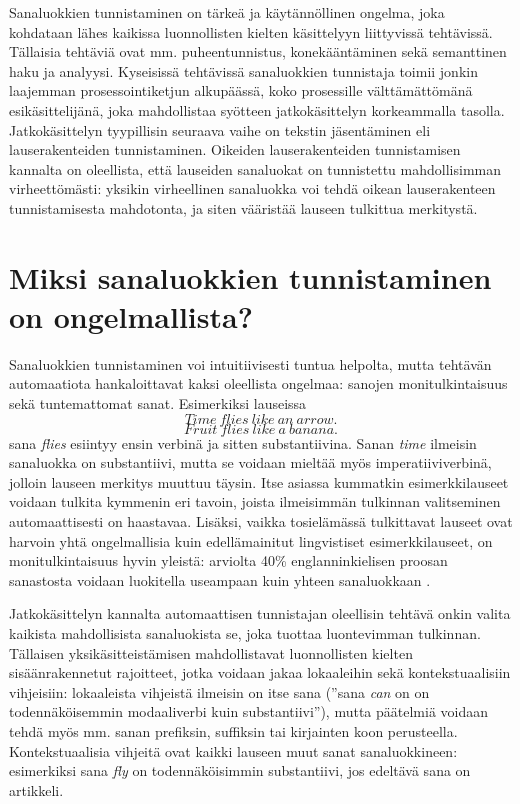 \documentclass[utf8,bachelor,manualbib]{gradu3}
\begin{document}
Sanaluokkien tunnistaminen on tärkeä ja käytännöllinen ongelma, joka kohdataan lähes kaikissa luonnollisten kielten käsittelyyn liittyvissä tehtävissä. Tällaisia tehtäviä ovat mm. puheentunnistus, konekääntäminen sekä semanttinen haku ja analyysi. Kyseisissä tehtävissä sanaluokkien tunnistaja toimii jonkin laajemman prosessointiketjun alkupäässä, koko prosessille välttämättömänä esikäsittelijänä, joka mahdollistaa syötteen jatkokäsittelyn korkeammalla tasolla. Jatkokäsittelyn tyypillisin seuraava vaihe on tekstin jäsentäminen eli lauserakenteiden tunnistaminen. Oikeiden lauserakenteiden tunnistamisen kannalta on oleellista, että lauseiden sanaluokat on tunnistettu mahdollisimman virheettömästi: yksikin virheellinen sanaluokka voi tehdä oikean lauserakenteen tunnistamisesta mahdotonta, ja siten vääristää lauseen tulkittua merkitystä.


\section{Miksi sanaluokkien tunnistaminen on ongelmallista?}

Sanaluokkien tunnistaminen voi intuitiivisesti tuntua helpolta, mutta tehtävän automaatiota hankaloittavat kaksi oleellista ongelmaa: sanojen monitulkintaisuus sekä tuntemattomat sanat. Esimerkiksi lauseissa
\[Time\: flies\: like\: an\: arrow.\]
\[Fruit\: flies\: like\: a\: banana.\]
sana \textit{flies} esiintyy ensin verbinä ja sitten substantiivina. Sanan \textit{time} ilmeisin sanaluokka on substantiivi, mutta se voidaan mieltää myös imperatiiviverbinä, jolloin lauseen merkitys muuttuu täysin. Itse asiassa kummatkin esimerkkilauseet voidaan tulkita kymmenin eri tavoin, joista ilmeisimmän tulkinnan valitseminen automaattisesti on haastavaa. Lisäksi, vaikka tosielämässä tulkittavat lauseet ovat harvoin yhtä ongelmallisia kuin edellämainitut lingvistiset esimerkkilauseet, on monitulkintaisuus hyvin yleistä: arviolta 40\% englanninkielisen proosan sanastosta voidaan luokitella useampaan kuin yhteen sanaluokkaan \citep{derose1988}. 

Jatkokäsittelyn kannalta automaattisen tunnistajan oleellisin tehtävä onkin valita kaikista mahdollisista sanaluokista se, joka tuottaa luontevimman tulkinnan. Tällaisen yksikäsitteistämisen mahdollistavat luonnollisten kielten sisäänrakennetut rajoitteet, jotka voidaan jakaa lokaaleihin sekä kontekstuaalisiin vihjeisiin: lokaaleista vihjeistä ilmeisin on itse sana (''sana \textit{can} on on todennäköisemmin modaaliverbi kuin substantiivi''), mutta päätelmiä voidaan tehdä myös mm. sanan prefiksin, suffiksin tai kirjainten koon perusteella. Kontekstuaalisia vihjeitä ovat kaikki lauseen muut sanat sanaluokkineen: esimerkiksi sana \textit{fly} on todennäköisimmin substantiivi, jos edeltävä sana on artikkeli.
\end{document}
